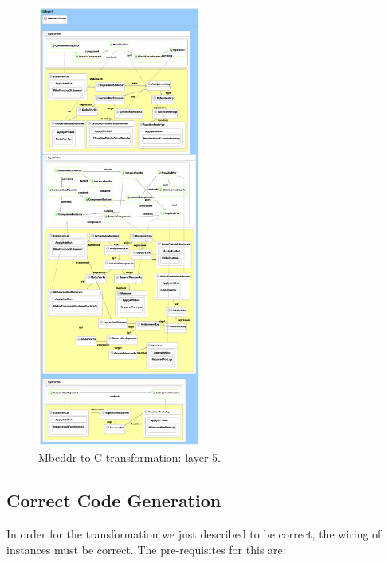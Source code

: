 \begin{figure}
\begin{center}
  \includegraphics[width=0.48\textwidth]{figures/mbeddr2C_optimized_layer_5}
  \caption{Mbeddr-to-C transformation: layer 5.}
  \label{fig:mb2c_layer_5}
\end{center}
\end{figure}


\subsection{Correct Code Generation}


In order for the transformation we just described to be correct, the wiring of
instances must be correct. The pre-requisites for this are:

